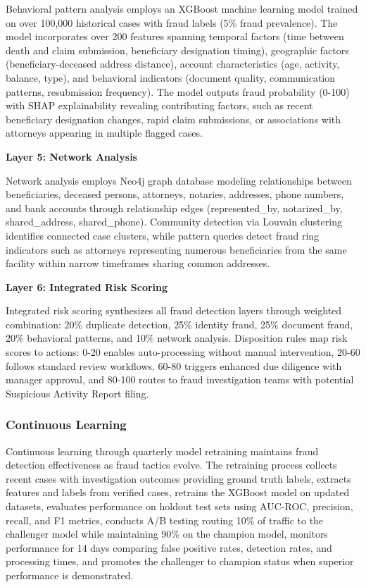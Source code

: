 Behavioral pattern analysis employs an XGBoost machine learning model trained on over 100,000 historical cases with fraud labels (5\% fraud prevalence). The model incorporates over 200 features spanning temporal factors (time between death and claim submission, beneficiary designation timing), geographic factors (beneficiary-deceased address distance), account characteristics (age, activity, balance, type), and behavioral indicators (document quality, communication patterns, resubmission frequency). The model outputs fraud probability (0-100) with SHAP explainability revealing contributing factors, such as recent beneficiary designation changes, rapid claim submissions, or associations with attorneys appearing in multiple flagged cases.

\textbf{Layer 5: Network Analysis}

Network analysis employs Neo4j graph database modeling relationships between beneficiaries, deceased persons, attorneys, notaries, addresses, phone numbers, and bank accounts through relationship edges (represented_by, notarized_by, shared_address, shared_phone). Community detection via Louvain clustering identifies connected case clusters, while pattern queries detect fraud ring indicators such as attorneys representing numerous beneficiaries from the same facility within narrow timeframes sharing common addresses.

\textbf{Layer 6: Integrated Risk Scoring}

Integrated risk scoring synthesizes all fraud detection layers through weighted combination: 20\% duplicate detection, 25\% identity fraud, 25\% document fraud, 20\% behavioral patterns, and 10\% network analysis. Disposition rules map risk scores to actions: 0-20 enables auto-processing without manual intervention, 20-60 follows standard review workflows, 60-80 triggers enhanced due diligence with manager approval, and 80-100 routes to fraud investigation teams with potential Suspicious Activity Report filing.

\subsubsection{Continuous Learning}

Continuous learning through quarterly model retraining maintains fraud detection effectiveness as fraud tactics evolve. The retraining process collects recent cases with investigation outcomes providing ground truth labels, extracts features and labels from verified cases, retrains the XGBoost model on updated datasets, evaluates performance on holdout test sets using AUC-ROC, precision, recall, and F1 metrics, conducts A/B testing routing 10\% of traffic to the challenger model while maintaining 90\% on the champion model, monitors performance for 14 days comparing false positive rates, detection rates, and processing times, and promotes the challenger to champion status when superior performance is demonstrated.

